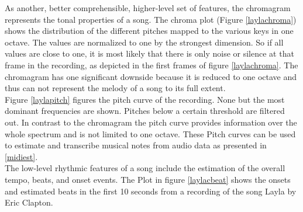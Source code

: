 As another, better comprehensible, higher-level set of features, the chromagram represents the tonal properties of a song. The chroma plot (Figure \ref{laylachroma}) shows the distribution of the different pitches mapped to the various keys in one octave. The values are normalized to one by the strongest dimension. So if all values are close to one, it is most likely that there is only noise or silence at that frame in the recording, as depicted in the first frames of figure \ref{laylachroma}. The chromagram has one significant downside because it is reduced to one octave and thus can not represent the melody of a song to its full extent.\\
Figure \ref{laylapitch} figures the pitch curve of the recording. None but the most dominant frequencies are shown. Pitches below a certain threshold are filtered out. In contrast to the chromagram the pitch curve provides information over the whole spectrum and is not limited to one octave. These Pitch curves can be used to estimate and transcribe musical notes from audio data as presented in \ref{midiest}.\\
The low-level rhythmic features of a song include the estimation of the overall tempo, beats, and onset events. 
The Plot in figure \ref{laylacbeat} shows the onsets and estimated beats in the first 10 seconds from a recording of the song Layla by Eric Clapton.
